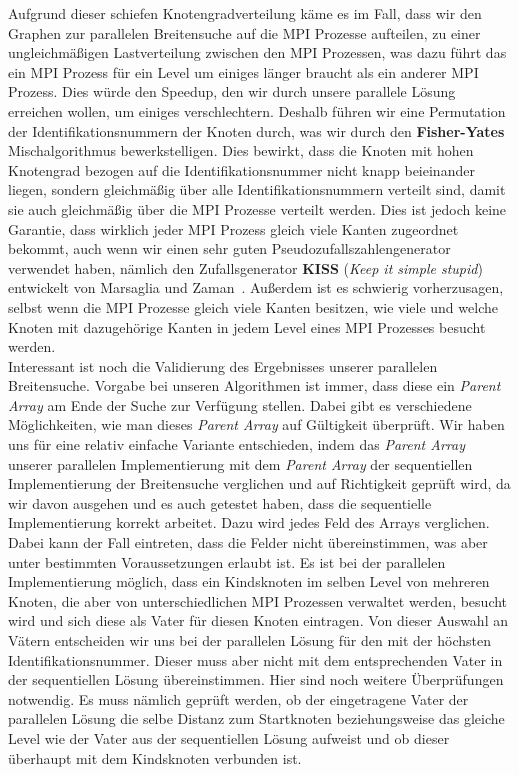 \documentclass[11pt,a4paper]{article}
\begin{document}
Aufgrund dieser schiefen Knotengradverteilung käme es im Fall, dass wir den Graphen zur parallelen Breitensuche auf die MPI Prozesse aufteilen, zu einer ungleichmäßigen Lastverteilung zwischen den MPI Prozessen, was dazu führt das ein MPI Prozess für ein Level um einiges länger braucht als ein anderer MPI Prozess. Dies würde den Speedup, den wir durch unsere parallele Lösung erreichen wollen, um einiges verschlechtern. Deshalb führen wir eine Permutation der Identifikationsnummern der Knoten durch, was wir durch den \textbf{Fisher-Yates} Mischalgorithmus bewerkstelligen. Dies bewirkt, dass die Knoten mit hohen Knotengrad bezogen auf die Identifikationsnummer nicht knapp beieinander liegen, sondern gleichmäßig über alle Identifikationsnummern verteilt sind, damit sie auch gleichmäßig über die MPI Prozesse verteilt werden. Dies ist jedoch keine Garantie, dass wirklich jeder MPI Prozess gleich viele Kanten zugeordnet bekommt, auch wenn wir einen sehr guten Pseudozufallszahlengenerator verwendet haben, nämlich den Zufallsgenerator \textbf{KISS} (\textit{Keep it simple stupid}) entwickelt von Marsaglia und Zaman~\cite{kiss}. Außerdem ist es schwierig vorherzusagen, selbst wenn die MPI Prozesse gleich viele Kanten besitzen, wie viele und welche Knoten mit dazugehörige Kanten in jedem Level eines MPI Prozesses besucht werden.\\
Interessant ist noch die Validierung des Ergebnisses unserer parallelen Breitensuche. Vorgabe bei unseren Algorithmen ist immer, dass diese ein \textit{Parent Array} am Ende der Suche zur Verfügung stellen. Dabei gibt es verschiedene Möglichkeiten, wie man dieses \textit{Parent Array} auf Gültigkeit überprüft. Wir haben uns für eine relativ einfache Variante entschieden, indem das \textit{Parent Array} unserer parallelen Implementierung mit dem \textit{Parent Array} der sequentiellen Implementierung der Breitensuche verglichen und auf Richtigkeit geprüft wird, da wir davon ausgehen und es auch getestet haben, dass die sequentielle Implementierung korrekt arbeitet. Dazu wird jedes Feld des Arrays verglichen. Dabei kann der Fall eintreten, dass die Felder nicht übereinstimmen, was aber unter bestimmten Voraussetzungen erlaubt ist. Es ist bei der parallelen Implementierung möglich, dass ein Kindsknoten im selben Level von mehreren Knoten, die aber von unterschiedlichen MPI Prozessen verwaltet werden, besucht wird und sich diese als Vater für diesen Knoten eintragen. Von dieser Auswahl an Vätern entscheiden wir uns bei der parallelen Lösung für den mit der höchsten Identifikationsnummer. Dieser muss aber nicht mit dem entsprechenden Vater in der sequentiellen Lösung übereinstimmen. Hier sind noch weitere Überprüfungen notwendig. Es muss nämlich geprüft werden, ob der eingetragene Vater der parallelen Lösung die selbe Distanz zum Startknoten beziehungsweise das gleiche Level wie der Vater aus der sequentiellen Lösung aufweist und ob dieser überhaupt mit dem Kindsknoten verbunden ist.\\
\end{document}
